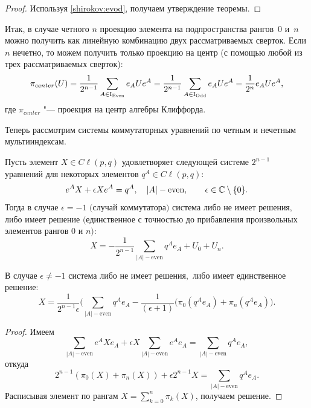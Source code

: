 \smallskip
\begin{proof} Используя \eqref{shirokov:evod}, получаем утверждение теоремы. \end{proof}

\smallskip

Итак, в случае четного $n$ проекцию элемента на подпространства рангов~$0$ и~$n$ можно получить как линейную комбинацию двух рассматриваемых сверток.
Если $n$ нечетно, то можем получить только проекцию на центр (с помощью любой из трех рассматриваемых сверток):
$$\pi_{center}(U)=\frac{1}{2^{n-1}}\sum_{A\in{\rm I}_ {\mathop{\rm Even}}}e_A U e^A=\frac{1}{2^{n-1}}\sum_{A\in{\rm I}_ {\mathop{\rm Odd}}}e_A U e^A=\frac{1}{2^n}e_A U e^A,$$
где $\pi_{center}$ "--- проекция на центр алгебры Клиффорда.

Теперь рассмотрим системы коммутаторных уравнений по четным и нечетным мультииндексам.

\smallskip

\begin{theorem}[6]Пусть элемент $X\in {{C}\!\ell}(p,q)$ удовлетворяет следующей системе $2^{n-1}$ уравнений для некоторых элементов $q^A\in{{C}\!\ell}(p,q){:}$
\begin{equation}
e^A X+\epsilon X e^A=q^A,\quad |A|- \text{even},\qquad \epsilon\in{\Bbb C}\setminus\{0\}.
\end{equation}
Тогда в случае $\epsilon=-1$  $($случай коммутатора$)$
система либо не имеет ре\-ше\-ния$,$ либо имеет решение $($единственное с точностью до прибавления произвольных элементов рангов $0$ и $n){:}$
\begin{equation}
X=-\frac{1}{2^{n-1}}\sum_{|A|-\text{even}}q^A e_A+U_0+U_n.
\end{equation}

В случае $\epsilon\neq -1$ система либо не имеет ре\-ше\-ния$,$ либо имеет единственное решение{\rm:}
\begin{equation}
X=\frac{1}{2^{n-1}\epsilon}\biggl(\sum_{|A|-\text{even}}q^A e_A-\frac{1}{(\epsilon+1)}(\pi_0(q^Ae_A)+\pi_n(q^Ae_A)\biggr).
\end{equation}
\end{theorem}
\smallskip

\begin{proof} Имеем
$$\sum_{|A|-\text{even}}e^A X e_A+\epsilon X \sum_{|A|-\text{even}}e^A e_A=\sum_{|A|-\text{even}}q^A e_A,$$
откуда
$$2^{n-1}(\pi_0(X)+\pi_n(X))+\epsilon 2^{n-1} X =\sum_{|A|-\text{even}}q^A e_A.$$
Расписывая элемент по рангам $X=\sum_{k=0}^n \pi_k(X)$, получаем решение.
\end{proof}


